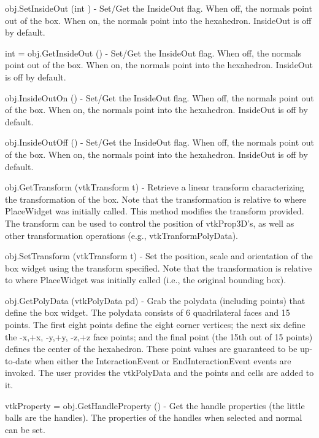 \begin{DoxyItemize}
\item {\ttfamily obj.\-Set\-Inside\-Out (int )} -\/ Set/\-Get the Inside\-Out flag. When off, the normals point out of the box. When on, the normals point into the hexahedron. Inside\-Out is off by default.  
\item {\ttfamily int = obj.\-Get\-Inside\-Out ()} -\/ Set/\-Get the Inside\-Out flag. When off, the normals point out of the box. When on, the normals point into the hexahedron. Inside\-Out is off by default.  
\item {\ttfamily obj.\-Inside\-Out\-On ()} -\/ Set/\-Get the Inside\-Out flag. When off, the normals point out of the box. When on, the normals point into the hexahedron. Inside\-Out is off by default.  
\item {\ttfamily obj.\-Inside\-Out\-Off ()} -\/ Set/\-Get the Inside\-Out flag. When off, the normals point out of the box. When on, the normals point into the hexahedron. Inside\-Out is off by default.  
\item {\ttfamily obj.\-Get\-Transform (vtk\-Transform t)} -\/ Retrieve a linear transform characterizing the transformation of the box. Note that the transformation is relative to where Place\-Widget was initially called. This method modifies the transform provided. The transform can be used to control the position of vtk\-Prop3\-D's, as well as other transformation operations (e.\-g., vtk\-Tranform\-Poly\-Data).  
\item {\ttfamily obj.\-Set\-Transform (vtk\-Transform t)} -\/ Set the position, scale and orientation of the box widget using the transform specified. Note that the transformation is relative to where Place\-Widget was initially called (i.\-e., the original bounding box).  
\item {\ttfamily obj.\-Get\-Poly\-Data (vtk\-Poly\-Data pd)} -\/ Grab the polydata (including points) that define the box widget. The polydata consists of 6 quadrilateral faces and 15 points. The first eight points define the eight corner vertices; the next six define the -\/x,+x, -\/y,+y, -\/z,+z face points; and the final point (the 15th out of 15 points) defines the center of the hexahedron. These point values are guaranteed to be up-\/to-\/date when either the Interaction\-Event or End\-Interaction\-Event events are invoked. The user provides the vtk\-Poly\-Data and the points and cells are added to it.  
\item {\ttfamily vtk\-Property = obj.\-Get\-Handle\-Property ()} -\/ Get the handle properties (the little balls are the handles). The properties of the handles when selected and normal can be set.  

\end{DoxyItemize}
